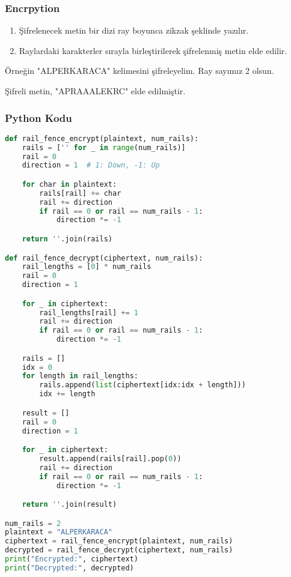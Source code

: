\subsubsection{Encrpytion}

\begin{enumerate}
    \item Şifrelenecek metin bir dizi ray boyunca zikzak şeklinde yazılır.
    \item Raylardaki karakterler sırayla birleştirilerek şifrelenmiş metin elde edilir.
\end{enumerate}

Örneğin "ALPERKARACA" kelimesini şifreleyelim. Ray sayımız 2 olsun.

\begin{table}[ht]
\centering
{}
\end{table}

Şifreli metin, "APRAAALEKRC" elde edilmiştir.

\subsubsection{Python Kodu}

\begin{lstlisting}[language=Python]
def rail_fence_encrypt(plaintext, num_rails):
    rails = ['' for _ in range(num_rails)]
    rail = 0
    direction = 1  # 1: Down, -1: Up

    for char in plaintext:
        rails[rail] += char
        rail += direction
        if rail == 0 or rail == num_rails - 1:
            direction *= -1

    return ''.join(rails)

def rail_fence_decrypt(ciphertext, num_rails):
    rail_lengths = [0] * num_rails
    rail = 0
    direction = 1

    for _ in ciphertext:
        rail_lengths[rail] += 1
        rail += direction
        if rail == 0 or rail == num_rails - 1:
            direction *= -1

    rails = []
    idx = 0
    for length in rail_lengths:
        rails.append(list(ciphertext[idx:idx + length]))
        idx += length

    result = []
    rail = 0
    direction = 1

    for _ in ciphertext:
        result.append(rails[rail].pop(0))
        rail += direction
        if rail == 0 or rail == num_rails - 1:
            direction *= -1

    return ''.join(result)

num_rails = 2
plaintext = "ALPERKARACA"
ciphertext = rail_fence_encrypt(plaintext, num_rails)
decrypted = rail_fence_decrypt(ciphertext, num_rails)
print("Encrypted:", ciphertext)
print("Decrypted:", decrypted)
\end{lstlisting}

